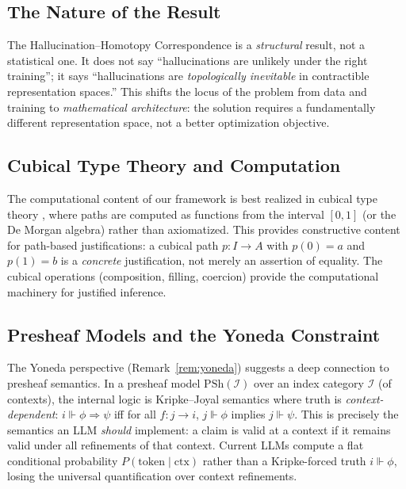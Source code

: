 \documentclass[11pt,a4paper]{article}
\theoremstyle{plain}
\theoremstyle{definition}
\newcommand{\PSh}{\mathrm{PSh}}
\begin{document}
\subsection{The Nature of the Result}

The Hallucination--Homotopy Correspondence is a \emph{structural} result, not a statistical one. It does not say ``hallucinations are unlikely under the right training''; it says ``hallucinations are \emph{topologically inevitable} in contractible representation spaces.'' This shifts the locus of the problem from data and training to \emph{mathematical architecture}: the solution requires a fundamentally different representation space, not a better optimization objective.

\subsection{Cubical Type Theory and Computation}

The computational content of our framework is best realized in cubical type theory \cite{cohen2018cubical}, where paths are computed as functions from the interval $[0,1]$ (or the De Morgan algebra) rather than axiomatized. This provides constructive content for path-based justifications: a cubical path $p\colon I \to A$ with $p(0) = a$ and $p(1) = b$ is a \emph{concrete} justification, not merely an assertion of equality. The cubical operations (composition, filling, coercion) provide the computational machinery for justified inference.

\subsection{Presheaf Models and the Yoneda Constraint}

The Yoneda perspective (Remark~\ref{rem:yoneda}) suggests a deep connection to presheaf semantics. In a presheaf model $\PSh(\mathcal{I})$ over an index category $\mathcal{I}$ (of contexts), the internal logic is Kripke--Joyal semantics where truth is \emph{context-dependent}: $i \Vdash \phi \Rightarrow \psi$ iff for all $f\colon j \to i$, $j \Vdash \phi$ implies $j \Vdash \psi$. This is precisely the semantics an LLM \emph{should} implement: a claim is valid at a context if it remains valid under all refinements of that context. Current LLMs compute a flat conditional probability $P(\text{token} \mid \text{ctx})$ rather than a Kripke-forced truth $i \Vdash \phi$, losing the universal quantification over context refinements.
\end{document}
